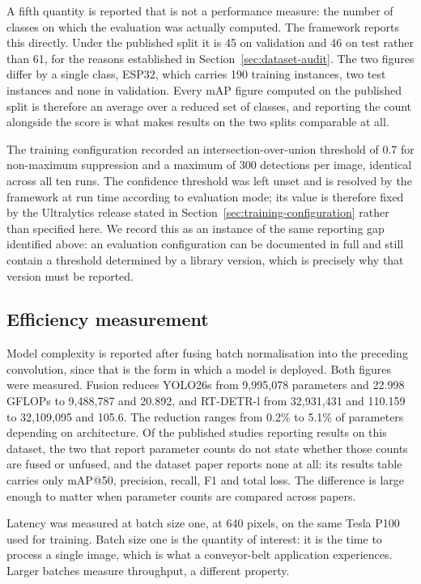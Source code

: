 A fifth quantity is reported that is not a performance measure: the number of
classes on which the evaluation was actually computed. The framework reports
this directly. Under the published split it is 45 on validation and 46 on test
rather than 61, for the reasons established in Section~\ref{sec:dataset-audit}.
The two figures differ by a single class, ESP32, which carries 190 training
instances, two test instances and none in validation. Every mAP figure computed
on the published split is therefore an average over a reduced set of classes,
and reporting the count alongside the score is what makes results on the two
splits comparable at all.

The training configuration recorded an intersection-over-union threshold of 0.7
for non-maximum suppression and a maximum of 300 detections per image, identical
across all ten runs. The confidence threshold was left unset and is resolved by
the framework at run time according to evaluation mode; its value is therefore
fixed by the Ultralytics release stated in Section~\ref{sec:training-configuration}
rather than specified here. We record this as an instance of the same reporting
gap identified above: an evaluation configuration can be documented in full and
still contain a threshold determined by a library version, which is precisely
why that version must be reported.

\subsection{Efficiency measurement}
\label{sec:efficiency-measurement}

Model complexity is reported after fusing batch normalisation into the preceding
convolution, since that is the form in which a model is deployed. Both figures
were measured. Fusion reduces YOLO26s from 9{,}995{,}078 parameters and 22.998
GFLOPs to 9{,}488{,}787 and 20.892, and RT-DETR-l from 32{,}931{,}431 and
110.159 to 32{,}109{,}095 and 105.6. The reduction ranges from 0.2\% to 5.1\% of
parameters depending on architecture. Of the published studies reporting results
on this dataset, the two that report parameter counts
\citep{yolov12paper,yolov13paper} do not state whether those counts are fused or
unfused, and the dataset paper \citep{electrocom61} reports none at all: its
results table carries only mAP@50, precision, recall, F1 and total loss. The
difference is large enough to matter when parameter counts are compared across
papers.

Latency was measured at batch size one, at 640 pixels, on the same Tesla P100
used for training. Batch size one is the quantity of interest: it is the time to
process a single image, which is what a conveyor-belt application experiences.
Larger batches measure throughput, a different property.

